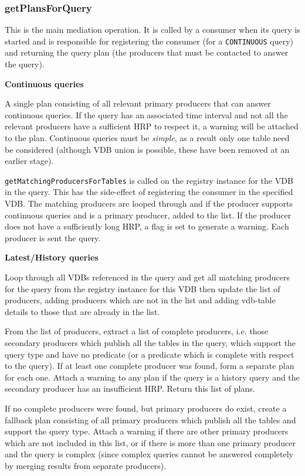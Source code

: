 \subsubsection{getPlansForQuery}

This is the main mediation operation. It is called by a consumer when its query is started
and is responsible for registering the consumer (for a \texttt{CONTINUOUS} query) and 
returning the query plan (the producers that must be contacted to answer the query).

\textbf{Continuous queries}

A single plan consisting of all relevant primary producers that can answer continuous
queries. If the query has an associated time interval 
and not all the relevant producers have a sufficient HRP to respect it, a 
warning will be attached to the plan. Continuous queries must be \textit{simple}, as
a result only one table need be considered (although VDB union is possible, these have
been removed at an earlier stage).

\texttt{getMatchingProducersForTables} is called on the registry instance for
the VDB in the query. This has the side-effect of registering the consumer in the
specified VDB. The matching producers are looped through and if the producer
supports continuous queries and is a primary producer, added to the list. If the
producer does not have a sufficiently long HRP, a flag is set to generate a
warning. Each producer is sent the query. 

\textbf{Latest/History queries}

Loop through all VDBs referenced in the query and get all matching producers for
the query from the registry instance for this VDB then update the list of producers, adding producers which are not in the list and
          adding vdb-table details to those that are already in the list.
  
  From the list of producers, extract a list of complete producers, i.e. those
        secondary producers which publish all the tables in the query, which support the
        query type and have no predicate (or a predicate which is complete with respect to the
        query).
  If at least one complete producer was found, form a separate plan for each one. Attach a
        warning to any plan if the query is a history query and the secondary producer has an
        insufficient HRP. Return this list of plans.
        
  If no complete producers were found, but primary producers do exist, create a fallback 
        plan consisting of all primary producers which publish all the tables and support the 
	query type. Attach a warning if there are other primary producers which are not included
        in this list, or if there is more than one primary producer and the query is complex
        (since complex queries cannot be answered completely by merging results from separate
        producers).
         
